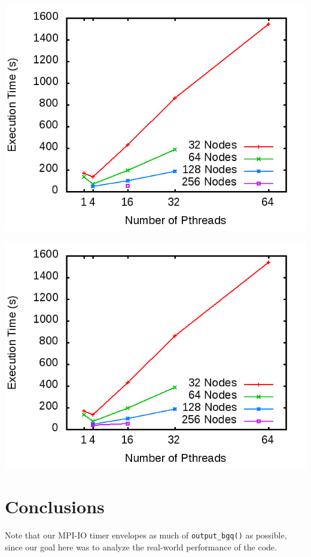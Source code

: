 \documentclass[11pt]{article}
\begin{document}
\begin{multicols*}{2}
\begin{center}
\begin{minipage}{0.4\textwidth}\centering
  \includegraphics[width=\textwidth]{img/prMC-exec}

  \includegraphics[width=\textwidth]{img/pr-exec}
\end{minipage}
\end{center}


\section{Conclusions}
Note that our MPI-IO timer envelopes as much of \texttt{output\_bgq()} as possible, since our goal here was to analyze the real-world performance of the code.


\end{multicols*}
\end{document}
